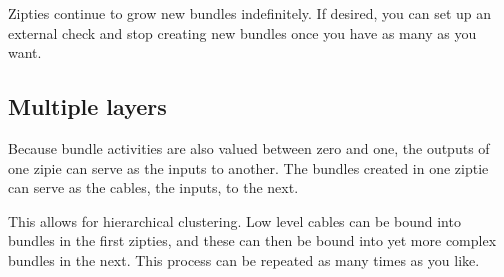 Zipties continue to grow new bundles indefinitely. If desired, you can set up an external
check and stop creating new bundles once you have as many as you want.

\subsection{Multiple layers}
\label{subsec:algolayers}

Because bundle activities are also valued between zero and one, the outputs
of one zipie can serve as the inputs to another. The bundles created
in one ziptie can serve as the cables, the inputs, to the next.

This allows for hierarchical clustering. Low level cables can be bound into bundles
in the first zipties, and these can then be bound into yet more
complex bundles in the next. This process can be repeated as many times as you like.

